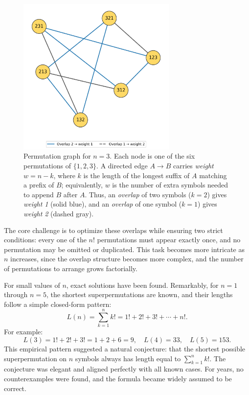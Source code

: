 \begin{figure}[ht]
  \centering
  \includegraphics[width=0.7\textwidth]{39_SuperpermutationsBreakthrough/permutation_graph_n3_spring.png}
  \caption{Permutation graph for \(n=3\). Each node is one of the six permutations of \(\{1,2,3\}\). A directed edge \(A\to B\) carries \emph{weight} \(w=n-k\), where \(k\) is the length of the longest suffix of \(A\) matching a prefix of \(B\); equivalently, \(w\) is the number of extra symbols needed to append \(B\) after \(A\). Thus, an \emph{overlap} of two symbols (\(k=2\)) gives \emph{weight 1} (solid blue), and an \emph{overlap} of one symbol (\(k=1\)) gives \emph{weight 2} (dashed gray).}
  \label{fig:permgraph3}
\end{figure}



The core challenge is to optimize these overlaps while ensuring two strict conditions: every one of the \(n!\) permutations must appear exactly once, and no permutation may be omitted or duplicated. This task becomes more intricate as \(n\) increases, since the overlap structure becomes more complex, and the number of permutations to arrange grows factorially.

For small values of \(n\), exact solutions have been found. Remarkably, for \(n = 1\) through \(n = 5\), the shortest superpermutations are known, and their lengths follow a simple closed-form pattern:
\[
L(n) = \sum_{k=1}^n k! = 1! + 2! + 3! + \cdots + n!.
\]
For example:
\[
L(3) = 1! + 2! + 3! = 1 + 2 + 6 = 9, \quad
L(4) = 33, \quad
L(5) = 153.
\]
This empirical pattern suggested a natural conjecture: that the shortest possible superpermutation on \(n\) symbols always has length equal to \(\sum_{k=1}^n k!\). The conjecture was elegant and aligned perfectly with all known cases. For years, no counterexamples were found, and the formula became widely assumed to be correct.

